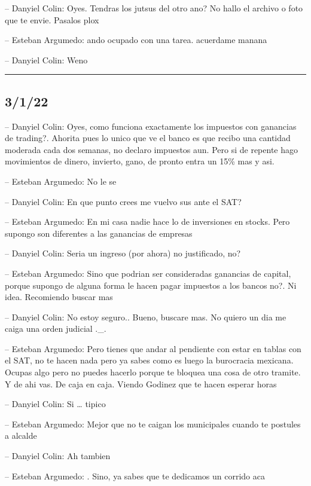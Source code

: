 -- Danyiel Colin: Oyes. Tendras los jutsus del otro ano? No hallo el
archivo o foto que te envie. Pasalos plox

-- Esteban Argumedo: ando ocupado con una tarea. acuerdame manana

-- Danyiel Colin: Weno

\begin{center}\rule{0.5\linewidth}{0.5pt}\end{center}

\hypertarget{section-21}{%
\subsection{3/1/22}\label{section-21}}

-- Danyiel Colin: Oyes, como funciona exactamente los impuestos con
ganancias de trading?. Ahorita pues lo unico que ve el banco es que
recibo una cantidad moderada cada dos semanas, no declaro impuestos aun.
Pero si de repente hago movimientos de dinero, invierto, gano, de pronto
entra un 15\% mas y asi.

-- Esteban Argumedo: No le se

-- Danyiel Colin: En que punto crees me vuelvo sus ante el SAT?

-- Esteban Argumedo: En mi casa nadie hace lo de inversiones en stocks.
Pero supongo son diferentes a las ganancias de empresas

-- Danyiel Colin: Seria un ingreso (por ahora) no justificado, no?

-- Esteban Argumedo: Sino que podrian ser consideradas ganancias de
capital, porque supongo de alguna forma le hacen pagar impuestos a los
bancos no?. Ni idea. Recomiendo buscar mas

-- Danyiel Colin: No estoy seguro.. Bueno, buscare mas. No quiero un dia
me caiga una orden judicial .\_.

-- Esteban Argumedo: Pero tienes que andar al pendiente con estar en
tablas con el SAT, no te hacen nada pero ya sabes como es luego la
burocracia mexicana. Ocupas algo pero no puedes hacerlo porque te
bloquea una cosa de otro tramite. Y de ahi vas. De caja en caja. Viendo
Godinez que te hacen esperar horas

-- Danyiel Colin: Si \ldots{} tipico

-- Esteban Argumedo: Mejor que no te caigan los municipales cuando te
postules a alcalde

-- Danyiel Colin: Ah tambien

-- Esteban Argumedo: . Sino, ya sabes que te dedicamos un corrido aca

